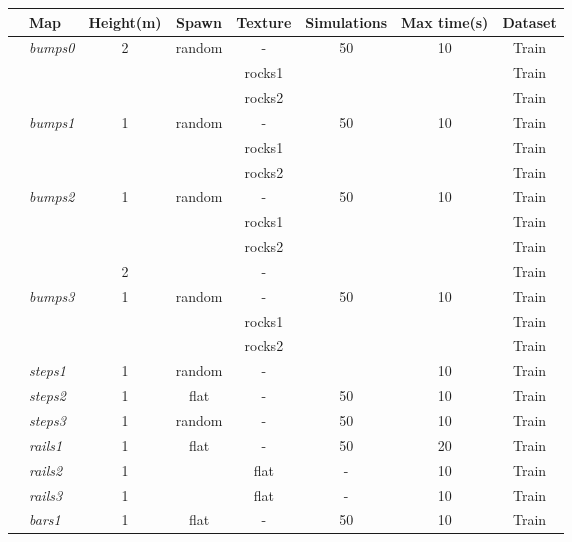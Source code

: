 \documentclass[../document.tex]{subfiles}
\begin{document}
\begin{table} [htbp]
    \centering
    
    \begin{tabular}[]{@{}llcccccc@{}}
      \toprule
      & Map & Height(m) & Spawn & Texture & Simulations & Max time(s) & Dataset \\ 
      \hline
      &\multirow{3}{*}{\emph{bumps0}} & \multirow{3}{*}{2} & \multirow{3}{*}{random} &- & \multirow{3}{*}{50} & \multirow{3}{*}{10} & Train \\
      &&&& rocks1 &  &  & Train \\ 
      &&&& rocks2 &  &  & Train \\ 
      \hline
      &\multirow{3}{*}{\emph{bumps1}} & \multirow{3}{*}{1} & \multirow{3}{*}{random}& - & \multirow{3}{*}{50} & \multirow{3}{*}{10} & Train \\
      &&&& rocks1 &  &  & Train \\ 
      &&&& rocks2 &  &  & Train \\ 
      \hline
      &\multirow{4}{*}{\emph{bumps2}} & \multirow{3}{*}{1} & \multirow{4}{*}{random} &- & \multirow{3}{*}{50} & \multirow{4}{*}{10} & Train \\
      &&&& rocks1 &  &  & Train \\ 
      &&&& rocks2 &  &  & Train \\ 
      && 2 && - &  &  & Train \\ 
      \hline
      &\multirow{3}{*}{\emph{bumps3}} & \multirow{3}{*}{1}& \multirow{3}{*}{random} & - & \multirow{4}{*}{50} & \multirow{3}{*}{10} & Train \\
      &&&& rocks1 &  &  & Train \\ 
      &&&& rocks2 &  &  & Train \\ 
      \hline
      &\emph{steps1} & 1 &random & - & 50 & 10 & Train \\
      \hline
      &\emph{steps2} & 1 &flat & - & 50  &  10& Train \\
      \hline
      &\emph{steps3} & 1 &random & - & 50  &  10& Train \\
      \hline
      &\emph{rails1} & 1 & flat & - & 50 & 20 & Train \\
      \hline
      &\emph{rails2} & 1 && flat & - & 10 & Train \\
      \hline
      &\emph{rails3} & 1 &&  flat&  - & 10 & Train \\
      \hline
      &\multirow{2}{*}{\emph{bars1}} & 1 & \multirow{2}{*}{flat} & - & \multirow{2}{*}{50} & \multirow{2}{*}{10} & Train \\

\end{tabular}
\end{table}
\end{document}
